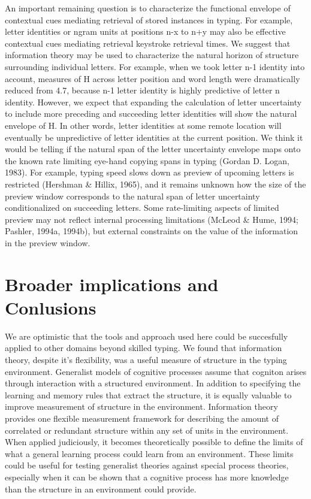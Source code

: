 \documentclass[floatsintext,man]{apa6}
\theoremstyle{definition}
\theoremstyle{definition}
\theoremstyle{definition}
\theoremstyle{remark}
\begin{document}
An important remaining question is to characterize the functional
envelope of contextual cues mediating retrieval of stored instances in
typing. For example, letter identities or ngram units at positions n-x
to n+y may also be effective contextual cues mediating retrieval
keystroke retrieval times. We suggest that information theory may be
used to characterize the natural horizon of structure surrounding
individual letters. For example, when we took letter n-1 identity into
account, measures of H across letter position and word length were
dramatically reduced from 4.7, because n-1 letter identity is highly
predictive of letter n identity. However, we expect that expanding the
calculation of letter uncertainty to include more preceding and
succeeding letter identities will show the natural envelope of H. In
other words, letter identities at some remote location will eventually
be unpredictive of letter identities at the current position. We think
it would be telling if the natural span of the letter uncertainty
envelope maps onto the known rate limiting eye-hand copying spans in
typing (Gordan D. Logan, 1983). For example, typing speed slows down as
preview of upcoming letters is restricted (Hershman \& Hillix, 1965),
and it remains unknown how the size of the preview window corresponds to
the natural span of letter uncertainty conditionalized on succeeding
letters. Some rate-limiting aspects of limited preview may not reflect
internal processing limitations (McLeod \& Hume, 1994; Pashler, 1994a,
1994b), but external constraints on the value of the information in the
preview window.

\section{Broader implications and
Conlusions}\label{broader-implications-and-conlusions}

We are optimistic that the tools and approach used here could be
succesfully applied to other domains beyond skilled typing. We found
that information theory, despite it's flexibility, was a useful measure
of structure in the typing environment. Generalist models of cognitive
processes assume that cogniton arises through interaction with a
structured environment. In addition to specifying the learning and
memory rules that extract the structure, it is equally valuable to
improve measurement of structure in the environment. Information theory
provides one flexible measurement framework for describing the amount of
correlated or redundant structure within any set of units in the
environment. When applied judiciously, it becomes theoretically possible
to define the limits of what a general learning process could learn from
an environment. These limits could be useful for testing generalist
theories against special process theories, especially when it can be
shown that a cognitive process has more knowledge than the structure in
an environment could provide.
\end{document}
